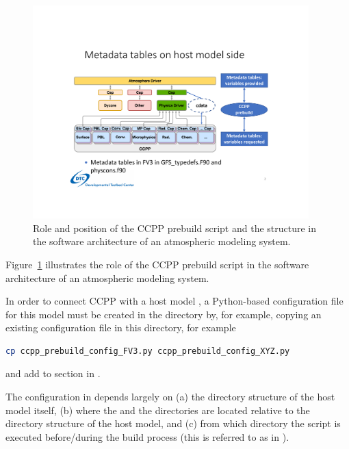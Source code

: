 \begin{figure}[h]
\centerline{\includegraphics[width=0.95\textwidth]{./images/ccpp_design_with_ccpp_prebuild.pdf}}
\caption{Role and position of the CCPP prebuild script and the  structure in the software architecture of an atmospheric modeling system.}\label{fig_ccpp_design_with_ccpp_prebuild}
\end{figure}
Figure~\ref{fig_ccpp_design_with_ccpp_prebuild} illustrates the role of the CCPP prebuild script in the software architecture of an atmospheric modeling system.

In order to connect CCPP with a host model , a Python-based configuration file for this model must be created in the directory  by, for example, copying an existing configuration file in this directory, for example
\begin{lstlisting}[language=bash]
cp ccpp_prebuild_config_FV3.py ccpp_prebuild_config_XYZ.py
\end{lstlisting}
and add  to section  in .

The configuration in  depends largely on (a) the directory structure of the host model itself, (b) where the  and the  directories are located relative to the directory structure of the host model, and (c) from which directory the  script is executed before/during the build process (this is referred to as  in ).

